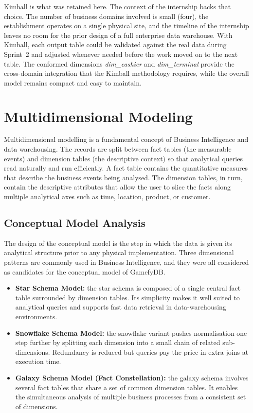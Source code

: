 \documentclass[12pt, a4paper]{report}
\begin{document}
Kimball is what was retained here. The context of the internship
backs that choice. The number of business domains involved is
small (four), the establishment operates on a single physical site, and
the timeline of the internship leaves no room for the prior design of a
full enterprise data warehouse. With Kimball, each output table could be
validated against the real data during Sprint~2 and adjusted whenever
needed before the work moved on to the next table. The conformed
dimensions \textit{dim\_cashier} and \textit{dim\_terminal} provide the
cross-domain integration that the Kimball methodology requires, while the
overall model remains compact and easy to maintain.

\section{Multidimensional Modeling}

Multidimensional modelling is a fundamental concept of Business
Intelligence and data warehousing. The records are split between
fact tables (the measurable events) and dimension tables (the
descriptive context) so that analytical queries read naturally and
run efficiently. A fact table contains the quantitative measures that
describe the business events being analysed. The dimension tables, in
turn, contain the descriptive attributes that allow the user to slice the
facts along multiple analytical axes such as time, location, product, or
customer.

\subsection{Conceptual Model Analysis}

The design of the conceptual model is the step in which the data is given
its analytical structure prior to any physical implementation. Three
dimensional patterns are commonly used in Business Intelligence, and they
were all considered as candidates for the conceptual model of GamefyDB.

\begin{itemize}
  \item \textbf{Star Schema Model:} the star schema is composed of a
        single central fact table surrounded by dimension tables. Its
        simplicity makes it well suited to analytical queries and
        supports fast data retrieval in data-warehousing environments.
  \item \textbf{Snowflake Schema Model:} the snowflake variant pushes
        normalisation one step further by splitting each dimension into
        a small chain of related sub-dimensions. Redundancy is reduced
        but queries pay the price in extra joins at execution time.
  \item \textbf{Galaxy Schema Model (Fact Constellation):} the galaxy
        schema involves several fact tables that share a set of common
        dimension tables. It enables the simultaneous analysis of
        multiple business processes from a consistent set of dimensions.
\end{itemize}
\end{document}
